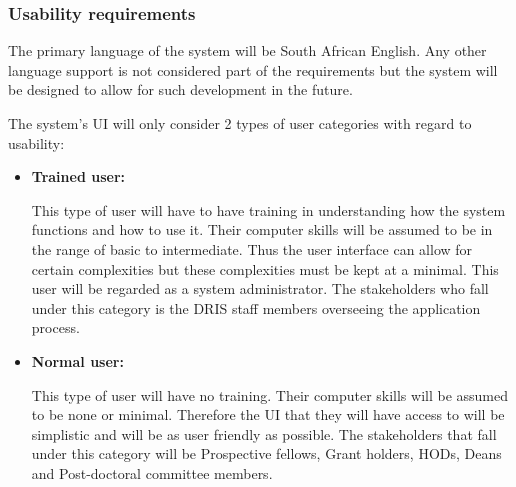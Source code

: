 \documentclass[12pt]{article}
\begin{document}
\subsubsection{Usability requirements}

\begin{flushleft}

The primary language of the system will be South African English. Any other language support is not considered part of the requirements but the system will be designed to allow for such development in the future.\\

\vspace{0.1in}

The system's UI will only consider 2 types of user categories with regard to usability:

\begin{itemize}

\item\textbf{Trained user:}

This type of user will have to have training in understanding how the system functions and how to use it. Their computer skills will be assumed to be in the range of basic to intermediate. Thus the user interface can allow for certain complexities but these complexities must be kept at a minimal. This user will be regarded as a system administrator. The stakeholders who fall under this category is the DRIS staff members overseeing the application process.

\item\textbf{Normal user:}

This type of user will have no training. Their computer skills will be assumed to be none or minimal. Therefore the UI that they will have access to will be simplistic and will be as user friendly as possible. The stakeholders that fall under this category will be Prospective fellows, Grant holders, HODs, Deans and Post-doctoral committee members.

\end{itemize}

\end{flushleft}

\vspace{0.2in}	
\end{document}
